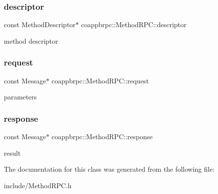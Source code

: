 \subsubsection{\texorpdfstring{descriptor}{descriptor}}
{\footnotesize\ttfamily const Method\+Descriptor$\ast$ coappbrpc\+::\+Method\+R\+P\+C\+::descriptor}

method descriptor \mbox{\label{classcoappbrpc_1_1MethodRPC_abc03c65fd8f6a540dacc0a1a7cf64695}} 
\subsubsection{\texorpdfstring{request}{request}}
{\footnotesize\ttfamily const Message$\ast$ coappbrpc\+::\+Method\+R\+P\+C\+::request}

parameters \mbox{\label{classcoappbrpc_1_1MethodRPC_abf2e75cc873ba1b4591b78f9e1955d49}} 
\subsubsection{\texorpdfstring{response}{response}}
{\footnotesize\ttfamily const Message$\ast$ coappbrpc\+::\+Method\+R\+P\+C\+::response}

result 

The documentation for this class was generated from the following file\+:\begin{DoxyCompactItemize}
\item 
include/Method\+R\+P\+C.\+h\end{DoxyCompactItemize}
